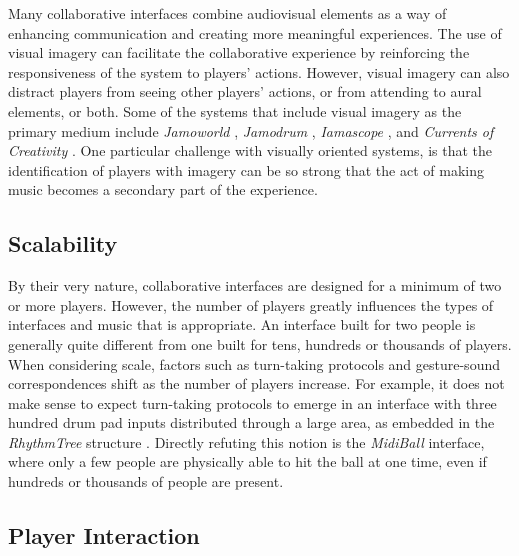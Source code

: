 Many collaborative interfaces combine audiovisual elements as a way of enhancing
communication and creating more meaningful experiences. The use of visual imagery
can facilitate the collaborative experience by reinforcing the responsiveness of
the system to players' actions.  However, visual imagery can also distract
players from seeing other players' actions, or from attending to aural elements,
or both. Some of the systems that include visual imagery as the primary medium
include \textit{Jamoworld } \cite{Blaine:2002}, \textit{Jamodrum} \cite{Blaine:2000}, \textit{Iamascope} \cite{Fels:1999},
and \textit{Currents of Creativity} \cite{DArcangelo:2001}. One particular challenge with visually
oriented systems, is that the identification of players with imagery can be so
strong that the act of making music becomes a secondary part of the experience.

\subsection{Scalability}

By their very nature, collaborative interfaces are designed for a minimum of two
or more players.  However, the number of players greatly influences the types of
interfaces and music that is appropriate.  An interface built for two people is
generally quite different from one built for tens, hundreds or thousands of
players. When considering scale, factors such as turn-taking protocols and
gesture-sound correspondences shift as the number of players increase.  For
example, it does not make sense to expect turn-taking protocols to emerge in an
interface with three hundred drum pad inputs distributed through a large area, as
embedded in the \textit{RhythmTree} structure \cite{Paradiso:1999}.  Directly refuting this
notion is the \textit{MidiBall} \cite{Jacobson:1993} interface, where only a few people are
physically able to hit the ball at one time, even if hundreds or thousands of
people are present.

\subsection{Player Interaction}

